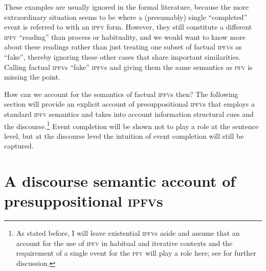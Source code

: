 \documentclass[output=paper]{langscibook}
\begin{document}
These examples are usually ignored in the formal literature, because the more extraordinary situation seems to be where a (presumably) single ``completed'' event is referred to with an \textsc{ipfv} form. However, they still constitute a different \textsc{ipfv} ``reading'' than process or habituality, and we would want to know more about these readings rather than just treating one subset of factual \textsc{ipfv}s as ``fake'', thereby ignoring these other cases that share important similarities. Calling factual \textsc{ipfv}s ``fake'' \textsc{ipfv}s and giving them the same semantics as \textsc{pfv} is missing the point. 

How can we account for the semantics of factual \textsc{ipfv}s then? %
The following section will provide an explicit account of presuppositional \textsc{ipfv}s that employs a standard \textsc{ipfv} semantics and takes into account information structural cues and the discourse.\footnote{As stated before, I will leave existential \textsc{ipfv}s aside and assume that an account for the use of \textsc{ipfv} in habitual and iterative contexts and the requirement of a single event for the \textsc{pfv} will play a role here; see \citet{gehrke22} for further discussion.} Event completion will be shown not to play a role at the sentence level, but at the discourse level the intuition of event completion will still be captured.

\section{A discourse semantic account of presuppositional \textsc{ipfv}s}
\label{gehr:sec:discourse}
\end{document}
